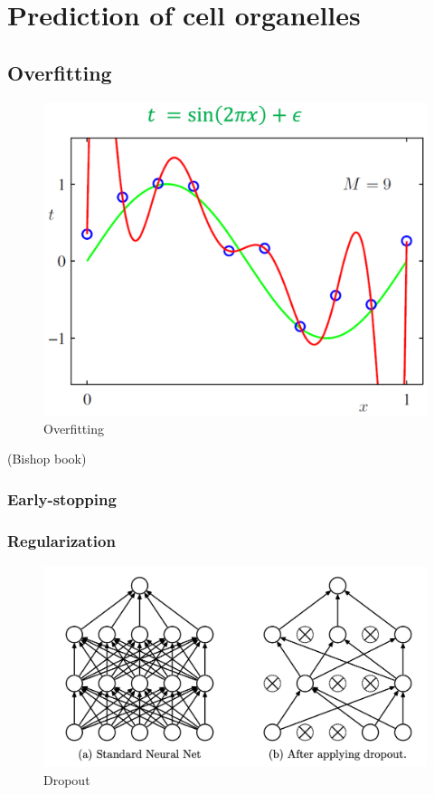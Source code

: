 \section{Prediction of cell organelles}
\subsection{Overfitting}

\begin{figure}[htb]
	\begin{center}
		\includegraphics[width=0.6\linewidth]{bilder/overfit.png}
		\caption{Overfitting}\label{fig:overfit}
	\end{center}
\end{figure}

(Bishop book)

\subsubsection{Early-stopping}
\subsubsection{Regularization}
\begin{figure}[htb]
	\begin{center}
		\includegraphics[width=0.8\linewidth]{bilder/dropout.png}
		\caption{Dropout}\label{fig:dropout}
	\end{center}
\end{figure}


